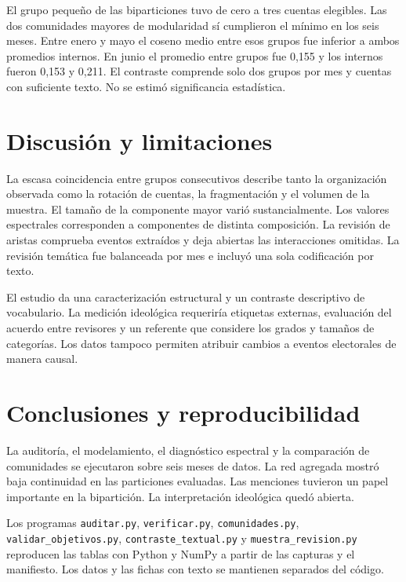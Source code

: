 \documentclass[journal]{IEEEtran}
\begin{document}
El grupo pequeño de las biparticiones tuvo de cero a tres cuentas elegibles. Las dos comunidades mayores de modularidad sí cumplieron el mínimo en los seis meses. Entre enero y mayo el coseno medio entre esos grupos fue inferior a ambos promedios internos. En junio el promedio entre grupos fue 0,155 y los internos fueron 0,153 y 0,211. El contraste comprende solo dos grupos por mes y cuentas con suficiente texto. No se estimó significancia estadística.

\section{Discusión y limitaciones}
La escasa coincidencia entre grupos consecutivos describe tanto la organización observada como la rotación de cuentas, la fragmentación y el volumen de la muestra. El tamaño de la componente mayor varió sustancialmente. Los valores espectrales corresponden a componentes de distinta composición. La revisión de aristas comprueba eventos extraídos y deja abiertas las interacciones omitidas. La revisión temática fue balanceada por mes e incluyó una sola codificación por texto.

El estudio da una caracterización estructural y un contraste descriptivo de vocabulario. La medición ideológica requeriría etiquetas externas, evaluación del acuerdo entre revisores y un referente que considere los grados y tamaños de categorías. Los datos tampoco permiten atribuir cambios a eventos electorales de manera causal.

\section{Conclusiones y reproducibilidad}
La auditoría, el modelamiento, el diagnóstico espectral y la comparación de comunidades se ejecutaron sobre seis meses de datos. La red agregada mostró baja continuidad en las particiones evaluadas. Las menciones tuvieron un papel importante en la bipartición. La interpretación ideológica quedó abierta.

Los programas \texttt{auditar.py}, \texttt{verificar.py}, \texttt{comunidades.py}, \texttt{validar\_objetivos.py}, \texttt{contraste\_textual.py} y \texttt{muestra\_revision.py} reproducen las tablas con Python y NumPy a partir de las capturas y el manifiesto. Los datos y las fichas con texto se mantienen separados del código.
\end{document}
